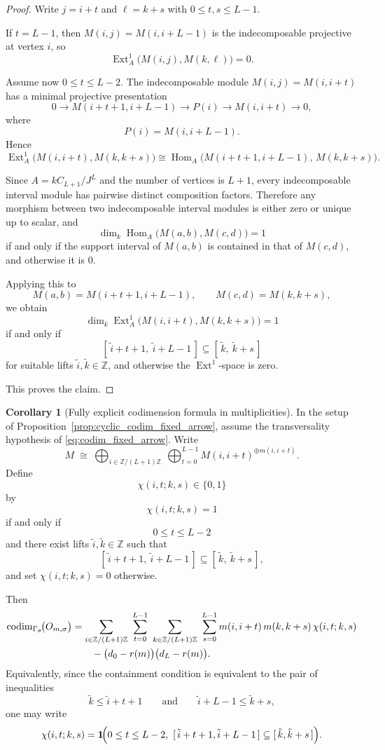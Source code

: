 \documentclass{article}
\newcommand{\Hom}{\operatorname{Hom}}
\newcommand{\codim}{\operatorname{codim}}
\newcommand{\Ext}{\operatorname{Ext}}
\theoremstyle{definition}
\newtheorem{corollary}[theorem]{Corollary}
\begin{document}
\begin{proof}
Write $j=i+t$ and $\ell=k+s$ with $0\le t,s\le L-1$.

If $t=L-1$, then $M(i,j)=M(i,i+L-1)$ is the indecomposable projective at vertex $i$, so
\[
\Ext_A^1\!\big(M(i,j),M(k,\ell)\big)=0.
\]

Assume now $0\le t\le L-2$. The indecomposable module $M(i,j)=M(i,i+t)$ has a minimal projective presentation
\[
0\longrightarrow M(i+t+1,i+L-1)\longrightarrow P(i)\longrightarrow M(i,i+t)\longrightarrow 0,
\]
where
\[
P(i)=M(i,i+L-1).
\]
Hence
\[
\Ext_A^1\!\big(M(i,i+t),M(k,k+s)\big)
\cong
\Hom_A\!\big(M(i+t+1,i+L-1),\,M(k,k+s)\big).
\]

Since $A=kC_{L+1}/J^L$ and the number of vertices is $L+1$, every indecomposable interval module has pairwise distinct composition factors. Therefore any morphism between two indecomposable interval modules is either zero or unique up to scalar, and
\[
\dim_k\Hom_A\!\big(M(a,b),M(c,d)\big)=1
\]
if and only if the support interval of $M(a,b)$ is contained in that of $M(c,d)$, and otherwise it is $0$.

Applying this to
\[
M(a,b)=M(i+t+1,i+L-1),\qquad M(c,d)=M(k,k+s),
\]
we obtain
\[
\dim_k\Ext_A^1\!\big(M(i,i+t),M(k,k+s)\big)=1
\]
if and only if
\[
[\,\tilde i+t+1,\ \tilde i+L-1\,]\subseteq [\,\tilde k,\ \tilde k+s\,]
\]
for suitable lifts $\tilde i,\tilde k\in\mathbb Z$, and otherwise the $\Ext^1$-space is zero.

This proves the claim.
\end{proof}

\begin{corollary}[Fully explicit codimension formula in multiplicities]\label{cor:explicit_codim_cycle}
In the setup of Proposition~\ref{prop:cyclic_codim_fixed_arrow}, assume the transversality hypothesis of \eqref{eq:codim_fixed_arrow}. Write
\[
M \;\cong\;
\bigoplus_{i\in \mathbb{Z}/(L+1)\mathbb{Z}}
\ \bigoplus_{t=0}^{L-1}
M(i,i+t)^{\oplus m(i,i+t)}.
\]
Define
\[
\chi(i,t;k,s)\in\{0,1\}
\]
by
\[
\chi(i,t;k,s)=1
\]
if and only if
\[
0\le t\le L-2
\]
and there exist lifts $\tilde i,\tilde k\in\mathbb Z$ such that
\[
[\,\tilde i+t+1,\ \tilde i+L-1\,]\subseteq [\,\tilde k,\ \tilde k+s\,],
\]
and set $\chi(i,t;k,s)=0$ otherwise.

Then
\begin{align}
\codim_{\Gamma_\sigma}\!\bigl(O_{m,\sigma}\bigr)
&=
\sum_{i\in \mathbb{Z}/(L+1)\mathbb{Z}}\ \sum_{t=0}^{L-1}
\ \sum_{k\in \mathbb{Z}/(L+1)\mathbb{Z}}\ \sum_{s=0}^{L-1}
m(i,i+t)\,m(k,k+s)\,\chi(i,t;k,s)
\notag\\
&\qquad
-\bigl(d_0-r(m)\bigr)\bigl(d_L-r(m)\bigr).
\label{eq:explicit_codim_cycle}
\end{align}
Equivalently, since the containment condition is equivalent to the pair of inequalities
\[
\tilde k\le \tilde i+t+1
\qquad\text{and}\qquad
\tilde i+L-1\le \tilde k+s,
\]
one may write
\[
\chi(i,t;k,s)
=
\mathbf 1\!\Bigl(
0\le t\le L-2,\ 
[\,\tilde i+t+1,\tilde i+L-1\,]\subseteq [\,\tilde k,\tilde k+s\,]
\Bigr).
\]
\end{corollary}
\end{document}
